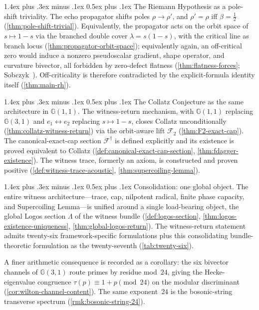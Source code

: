 \documentclass[11pt,a4paper]{article}
\makeatletter
\theoremstyle{plain}
\theoremstyle{definition}
\theoremstyle{remark}
\numberwithin{equation}{section}
\newcommand{\Cl}{\mathbb{G}}
\renewcommand{\paragraph}{%
  \@startsection{paragraph}{4}{0pt}%
    {1.4ex plus .3ex minus .1ex}%
    {0.5ex plus .1ex}%
    {\normalfont\normalsize\bfseries\color{headingAccent}}%
}
\makeatother
\begin{document}
\paragraph{The Riemann Hypothesis as a pole-shift triviality.}  The
echo propagator shifts poles \(\rho\to\rho'\), and
\(\rho'=\rho\) iff \(\beta=\tfrac12\)
(\cref{thm:pole-shift-trivial}).  Equivalently, the propagator acts
on the orbit space of \(s\mapsto1-s\) via the branched double cover
\(\lambda=s(1-s)\), with the critical line as branch locus
(\cref{thm:propagator-orbit-space}); equivalently again, an
off-critical zero would induce a nonzero pseudoscalar gradient,
shape operator, and curvature bivector, all forbidden by zero-defect
flatness (\cref{thm:flatness-forces}; Sobczyk~\cite{sobczyk1971}).
Off-criticality is therefore contradicted by the explicit-formula
identity itself (\cref{thm:main-rh}).

\paragraph{The Collatz Conjecture as the same architecture in
\(\Cl(1,1)\).}  The witness-return mechanism, with \(\Cl(1,1)\)
replacing \(\Cl(3,1)\) and \(e_1\leftrightarrow e_2\) replacing
\(s\mapsto1-s\), closes Collatz unconditionally
(\cref{thm:collatz-witness-return}) via the orbit-aware lift
\(\mathcal{F}_2\) (\cref{thm:F2-exact-cap}).  The
canonical-exact-cap section \(\mathcal{F}^{\dagger}\) is defined
explicitly and its existence is proved equivalent to Collatz
(\cref{def:canonical-exact-cap-section},
\cref{thm:fdagger-existence}).  The witness trace, formerly an
axiom, is constructed and proven positive
(\cref{def:witness-trace-acoustic},
\cref{thm:supercoiling-lemma}).

\paragraph{Consolidation: one global object.}  The entire witness
architecture---trace, cap, nilpotent radical, finite phase capacity,
and Supercoiling Lemma---is unified around a single load-bearing
object, the global Logos section \(\Lambda\) of the witness bundle
(\cref{def:logos-section}, \cref{thm:logos-existence-uniqueness},
\cref{thm:global-logos-return}).  The witness-return statement
admits twenty-six framework-specific formulations plus this
consolidating bundle-theoretic formulation as the twenty-seventh
(\cref{tab:twenty-six}).

A finer arithmetic consequence is recorded as a corollary: the six
bivector channels of \(\Cl(3,1)\) route primes by residue
mod~\(24\), giving the Hecke-eigenvalue congruence
\(\tau(p)\equiv 1+p\pmod{24}\) on the modular discriminant
(\cref{cor:wilton-channel-content}).  The same exponent~\(24\) is
the bosonic-string transverse spectrum (\cref{rmk:bosonic-string-24}).
\end{document}
